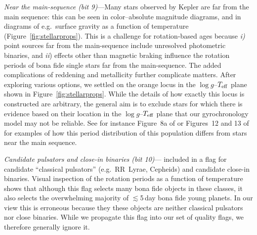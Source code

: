 \documentclass[11pt,twocolumn,tighten]{aastex63}
\begin{document}
{\it Near the main-sequence (bit 9)}---Many stars observed by Kepler
are far from the main sequence: this can be seen in color--absolute
magnitude diagrams, and in diagrams of e.g.~surface gravity as a
function of temperature (Figure~\ref{fig:stellarprops}).  This is a
challenge for rotation-based ages because {\it i)} point sources
far from the main-sequence include unresolved photometric binaries,
and {\it ii}) effects other than magnetic braking influence the
rotation periods of bona fide single stars far from the main-sequence.
The added complications of reddening and metallicity further
complicate matters.  
After exploring various options, we settled on the orange locus in the
$\log g$--$T_{\rm eff}$ plane shown in Figure~\ref{fig:stellarprops}.
While the details of how exactly this locus is constructed are
arbitrary, 
the general 
aim is to exclude stars for which there is evidence 
based on their location in the $\log g$--$T_{\rm eff}$ plane
that our gyrochronology model may not be reliable.  
See for instance Figure~8a of \citet{2022AJ....164..137K} or Figures~12 and 13
of \citet{2023ApJS..268....4F} for examples of how this period distribution
of this population differs from stars near the main sequence.


{\it Candidate pulsators and close-in binaries (bit
10)}---\citeauthor{Santos_2021} included in a flag for candidate
``classical pulsators'' (e.g.\ RR~Lyrae, Cepheids) and candidate
close-in binaries.  Visual inspection of the rotation periods as a
function of temperature shows that although this flag selects many
bona fide objects in these classes, it also selects the overwhelming
majority of $\lesssim$5\,day bona fide young planets.  In our view this is
erroneous because they these objects are neither classical pulsators nor
close binaries.  While we
propagate this flag into our set of quality flags, we therefore
generally ignore it.
\end{document}
